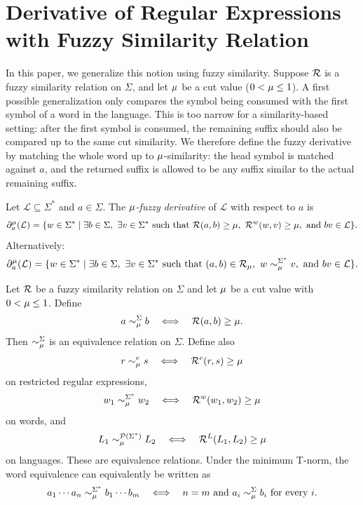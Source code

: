 \section{Derivative of Regular Expressions with Fuzzy Similarity Relation}\label{sec:fuzzy-derivatives}
In this paper, we generalize this notion using fuzzy similarity. Suppose ${\mathcal R}$ is
a fuzzy similarity relation on $\Sigma$, and let $\mu$ be a cut value
($0 < \mu \le 1$). A first possible generalization only compares the symbol
being consumed with the first symbol of a word in the language. This is too
narrow for a similarity-based setting: after the first symbol is consumed, the
remaining suffix should also be compared up to the same cut similarity. We
therefore define the fuzzy derivative by matching the whole word up to
$\mu$-similarity: the head symbol is matched against $a$, and the returned
suffix is allowed to be any suffix similar to the actual remaining suffix.

\begin{definition}\label{fuzzyderivative}
Let $\mathcal{L}\subseteq\Sigma^*$ and $a\in\Sigma$. The \emph{$\mu$-fuzzy
derivative} of $\mathcal{L}$ with respect to $a$ is
$$
\partial_a^\mu(\mathcal{L})
=
\{w \in \Sigma^* \mid
  \exists b \in \Sigma,\ \exists v\in\Sigma^*
  \text{ such that }
  {\mathcal R}(a,b) \ge \mu,\ \mathcal{R}^w(w,v)\ge\mu,\ \text{and } bv \in \mathcal{L}
\}.
$$
Alternatively:
$$
\partial_a^\mu(\mathcal{L})
=
\{w \in \Sigma^* \mid
  \exists b \in \Sigma,\ \exists v\in\Sigma^*
  \text{ such that }
  (a,b)\in{\mathcal R}_\mu,\ w\sim_\mu^{\Sigma^*}v,\ \text{and } bv\in\mathcal{L}
\}.
$$
\end{definition}

\begin{proposition}\label{prop:cut-equivalence}
Let ${\mathcal R}$ be a fuzzy similarity relation on $\Sigma$ and let $\mu$ be a cut value
with $0 < \mu \le 1$. Define
\[
  a \sim_\mu^\Sigma b \quad\Longleftrightarrow\quad {\mathcal R}(a,b)\ge \mu.
\]
Then $\sim_\mu^\Sigma$ is an equivalence relation on $\Sigma$. Define also
\[
  r\sim_\mu^e s
  \quad\Longleftrightarrow\quad
  \mathcal R^e(r,s)\ge\mu
\]
on restricted regular expressions,
\[
  w_1\sim_\mu^{\Sigma^*}w_2
  \quad\Longleftrightarrow\quad
  \mathcal R^w(w_1,w_2)\ge\mu
\]
on words, and
\[
  L_1\sim_\mu^{\mathcal P(\Sigma^*)}L_2
  \quad\Longleftrightarrow\quad
  \mathcal R^L(L_1,L_2)\ge\mu
\]
on languages. These are equivalence relations. Under the minimum T-norm, the
word equivalence can equivalently be written as
\[
  a_1\cdots a_n \sim_\mu^{\Sigma^*} b_1\cdots b_m
  \quad\Longleftrightarrow\quad
  n=m \text{ and } a_i \sim_\mu^\Sigma b_i \text{ for every } i.
\]
\end{proposition}

